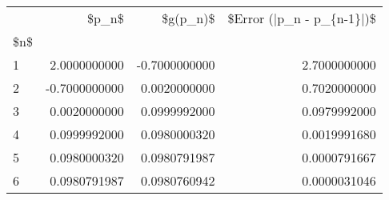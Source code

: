 \begin{tabular}{lrrr}
\toprule
{} &         \$p\_n\$ &      \$g(p\_n)\$ &  \$Error (|p\_n - p\_\{n-1\}|)\$ \\
\$n\$ &               &               &                            \\
\midrule
1   &  2.0000000000 & -0.7000000000 &               2.7000000000 \\
2   & -0.7000000000 &  0.0020000000 &               0.7020000000 \\
3   &  0.0020000000 &  0.0999992000 &               0.0979992000 \\
4   &  0.0999992000 &  0.0980000320 &               0.0019991680 \\
5   &  0.0980000320 &  0.0980791987 &               0.0000791667 \\
6   &  0.0980791987 &  0.0980760942 &               0.0000031046 \\
\bottomrule
\end{tabular}
